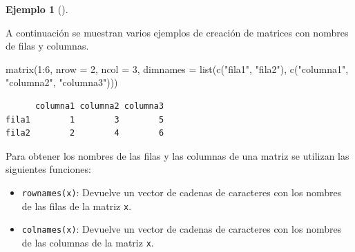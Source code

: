 \documentclass[
  a4paper,
]{scrreport}
\newenvironment{Shaded}{\begin{snugshade}}{\end{snugshade}}
\newcommand{\AttributeTok}[1]{\textcolor[rgb]{0.40,0.45,0.13}{#1}}
\newcommand{\DecValTok}[1]{\textcolor[rgb]{0.68,0.00,0.00}{#1}}
\newcommand{\FunctionTok}[1]{\textcolor[rgb]{0.28,0.35,0.67}{#1}}
\newcommand{\NormalTok}[1]{\textcolor[rgb]{0.00,0.23,0.31}{#1}}
\newcommand{\SpecialCharTok}[1]{\textcolor[rgb]{0.37,0.37,0.37}{#1}}
\newcommand{\StringTok}[1]{\textcolor[rgb]{0.13,0.47,0.30}{#1}}
\providecommand{\tightlist}{%
  \setlength{\itemsep}{0pt}\setlength{\parskip}{0pt}}\usepackage{longtable,booktabs,array}
\theoremstyle{definition}
\theoremstyle{definition}
\newtheorem{example}{Ejemplo}[chapter]
\theoremstyle{remark}
\begin{document}
\leavevmode{}%
\begin{example}[]\label{exm-creacion-matrices-con-nombres}

A continuación se muestran varios ejemplos de creación de matrices con
nombres de filas y columnas.

\begin{Shaded}
\begin{Highlighting}[]
\FunctionTok{matrix}\NormalTok{(}\DecValTok{1}\SpecialCharTok{:}\DecValTok{6}\NormalTok{, }\AttributeTok{nrow =} \DecValTok{2}\NormalTok{, }\AttributeTok{ncol =} \DecValTok{3}\NormalTok{, }\AttributeTok{dimnames =} \FunctionTok{list}\NormalTok{(}\FunctionTok{c}\NormalTok{(}\StringTok{"fila1"}\NormalTok{, }\StringTok{"fila2"}\NormalTok{), }\FunctionTok{c}\NormalTok{(}\StringTok{"columna1"}\NormalTok{, }\StringTok{"columna2"}\NormalTok{, }\StringTok{"columna3"}\NormalTok{)))}
\end{Highlighting}
\end{Shaded}

\begin{verbatim}
      columna1 columna2 columna3
fila1        1        3        5
fila2        2        4        6
\end{verbatim}

\end{example}

Para obtener los nombres de las filas y las columnas de una matriz se
utilizan las siguientes funciones:

\begin{itemize}
\tightlist
\item
  \texttt{rownames(x)}: Devuelve un vector de cadenas de caracteres con
  los nombres de las filas de la matriz \texttt{x}.
\item
  \texttt{colnames(x)}: Devuelve un vector de cadenas de caracteres con
  los nombres de las columnas de la matriz \texttt{x}.
\end{itemize}
\end{document}

